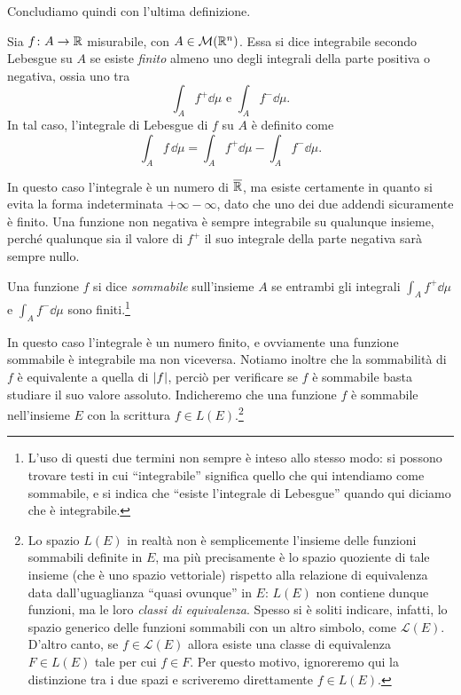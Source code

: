 Concludiamo quindi con l'ultima definizione.
\begin{definizione} \label{d:integrale-lebesgue-funzioni-qualunque}
	Sia $f\colon A\to\mathbb{R}$ misurabile, con $A\in\mathcal M(\mathbb{R}^n)$.
	Essa si dice integrabile secondo Lebesgue su $A$ se esiste \emph{finito} almeno uno degli integrali della parte positiva o negativa, ossia uno tra
	\begin{equation*}
		\int_Af^+\dd\mu\text{ e }\int_Af^-\dd\mu.
	\end{equation*}
	In tal caso, l'integrale di Lebesgue di $f$ su $A$ è definito come
	\begin{equation}
		\int_Af\,\dd\mu=\int_Af^+\dd\mu-\int_Af^-\dd\mu.
		\label{eq:integrale-lebesgue-funzioni-qualunque}
	\end{equation}
\end{definizione}
In questo caso l'integrale è un numero di $\overline{\mathbb{R}}$, ma esiste certamente in quanto si evita la forma indeterminata $+\infty-\infty$, dato che uno dei due addendi sicuramente è finito.
Una funzione non negativa è sempre integrabile su qualunque insieme, perch\'e qualunque sia il valore di $f^+$ il suo integrale della parte negativa sarà sempre nullo.
\begin{definizione} \label{d:funzione-sommabile}
	Una funzione $f$ si dice \emph{sommabile} sull'insieme $A$ se entrambi gli integrali $\int_Af^+\dd\mu$ e $\int_Af^-\dd\mu$ sono finiti.\footnote{L'uso di questi due termini non sempre è inteso allo stesso modo: si possono trovare testi in cui ``integrabile'' significa quello che qui intendiamo come sommabile, e si indica che ``esiste l'integrale di Lebesgue'' quando qui diciamo che è integrabile.}
\end{definizione}
In questo caso l'integrale è un numero finito, e ovviamente una funzione sommabile è integrabile ma non viceversa.
Notiamo inoltre che la sommabilità di $f$ è equivalente a quella di $\left|{f}\right|$, perciò per verificare se $f$ è sommabile basta studiare il suo valore assoluto.
Indicheremo che una funzione $f$ è sommabile nell'insieme $E$ con la scrittura $f\in L(E)$.\footnote{Lo spazio $L(E)$ in realtà non è semplicemente l'insieme delle funzioni sommabili definite in $E$, ma più precisamente è lo spazio quoziente di tale insieme (che è uno spazio vettoriale) rispetto alla relazione di equivalenza data dall'uguaglianza ``quasi ovunque'' in $E$: $L(E)$ non contiene dunque funzioni, ma le loro \emph{classi di equivalenza}. Spesso si è soliti indicare, infatti, lo spazio generico delle funzioni sommabili con un altro simbolo, come $\mathscr L(E)$. D'altro canto, se $f\in\mathscr L(E)$ allora esiste una classe di equivalenza $F\in L(E)$ tale per cui $f\in F$. Per questo motivo, ignoreremo qui la distinzione tra i due spazi e scriveremo direttamente $f\in L(E)$.}

